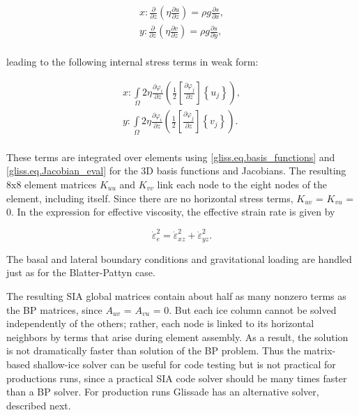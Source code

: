 \begin{equation}
  \label{gliss.eq.stress_balance_sia}
  \begin{split}
    x: \frac{\partial }{\partial z}\left( \eta \frac{\partial u}{\partial z} \right) = \rho g\frac{\partial s}{\partial x}, \\
    y: \frac{\partial }{\partial z}\left( \eta \frac{\partial v}{\partial z} \right) = \rho g\frac{\partial s}{\partial y}, \\
  \end{split}
\end{equation}

\noindent
leading to the following internal stress terms in weak form:

\begin{equation}
  \label{gliss.eq.element_matrix_sia}
  \begin{split}
    x: \int\limits_{\Omega } {2 \eta \frac{\partial {{\varphi }_{i}}}{\partial z}\left( \frac{1}{2}\left[ \frac{\partial {{\varphi }_{j}}}{\partial z} \right]\left\{ {{u}_{j}} \right\} \right) },  \\
    y: \int\limits_{\Omega } {2 \eta \frac{\partial {{\varphi }_{i}}}{\partial z}\left( \frac{1}{2}\left[ \frac{\partial {{\varphi }_{j}}}{\partial z} \right]\left\{ {{v}_{j}} \right\} \right) }.  \\
  \end{split}
\end{equation}

\noindent
These terms are integrated over elements using \eqref{gliss.eq.basis_functions}
and \eqref{gliss.eq.Jacobian_eval} for the 3D basis functions and Jacobians.
The resulting $8\text{x}8$ element matrices $K_{uu}$ and $K_{vv}$ link each node
to the eight nodes of the element, including itself.  Since there are no
horizontal stress terms, $K_{uv}$ = $K_{vu}$ = 0. In the expression for
effective viscosity, the effective strain rate is given by

\begin{equation}
  \label{gliss.eq.effective_strain_rate_sia}
        {\dot{\varepsilon }}^{2}_{e} = {\dot{\varepsilon }}^{2}_{xz} + {\dot{\varepsilon }}^{2}_{yz}.
\end{equation}

\noindent
The basal and lateral boundary conditions and gravitational loading are handled
just as for the Blatter-Pattyn case.

The resulting SIA global matrices contain about half as many nonzero terms as the BP matrices,
since $A_{uv}$ = $A_{vu}$ = 0.  But each ice column cannot be solved independently of the others;
rather, each node is linked to its horizontal neighbors by terms that arise during
element assembly.  As a result, the solution is not dramatically faster than solution
of the BP problem.  Thus the matrix-based shallow-ice solver can be useful for code testing
but is not practical for productions runs, since a practical SIA code solver should be many times
faster than a BP solver.  For production runs Glissade has an alternative solver,
described next.

